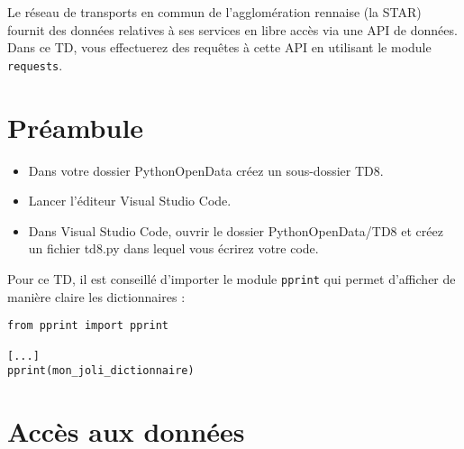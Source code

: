 \documentclass[11pt,a4paper]{article}
\begin{document}
Le réseau de transports en commun de l'agglomération rennaise (la STAR) fournit des données relatives à ses services en libre accès via une API de données.
Dans ce TD, vous effectuerez des requêtes à cette API en utilisant le module \verb+requests+.

\section*{Préambule}
\begin{itemize}
    \item Dans votre dossier PythonOpenData créez un sous-dossier TD8.
    \item Lancer l'éditeur Visual Studio Code.
    \item Dans Visual Studio Code, ouvrir le dossier PythonOpenData/TD8 et créez un fichier td8.py dans lequel vous écrirez votre code. 
\end{itemize}

Pour ce TD, il est conseillé d'importer le module \verb+pprint+ qui permet d'afficher de manière claire les dictionnaires :

\begin{verbatim}
from pprint import pprint

[...]
pprint(mon_joli_dictionnaire)
\end{verbatim}

\section{Accès aux données}
\end{document}
